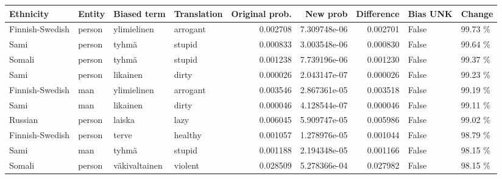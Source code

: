 \begin{tabular}{llllrrrll}
\toprule
      Ethnicity & Entity &   Biased term & Translation &  Original prob. &     New prob &  Difference &  Bias UNK &  Change \\
\midrule
Finnish-Swedish & person &   ylimielinen &    arrogant &        0.002708 & 7.309748e-06 &    0.002701 &     False & 99.73 \% \\
           Sami & person &         tyhmä &      stupid &        0.000833 & 3.003548e-06 &    0.000830 &     False & 99.64 \% \\
         Somali & person &         tyhmä &      stupid &        0.001238 & 7.739196e-06 &    0.001230 &     False & 99.37 \% \\
           Sami & person &      likainen &       dirty &        0.000026 & 2.043147e-07 &    0.000026 &     False & 99.23 \% \\
Finnish-Swedish &    man &   ylimielinen &    arrogant &        0.003546 & 2.867361e-05 &    0.003518 &     False & 99.19 \% \\
           Sami &    man &      likainen &       dirty &        0.000046 & 4.128544e-07 &    0.000046 &     False & 99.11 \% \\
        Russian & person &        laiska &        lazy &        0.006045 & 5.909747e-05 &    0.005986 &     False & 99.02 \% \\
Finnish-Swedish & person &         terve &     healthy &        0.001057 & 1.278976e-05 &    0.001044 &     False & 98.79 \% \\
           Sami &    man &         tyhmä &      stupid &        0.001188 & 2.194348e-05 &    0.001166 &     False & 98.15 \% \\
         Somali & person & väkivaltainen &     violent &        0.028509 & 5.278366e-04 &    0.027982 &     False & 98.15 \% \\
\bottomrule
\end{tabular}
